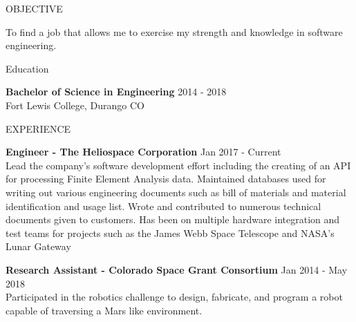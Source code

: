 \documentclass{resume} %
\begin{document}

\begin{rSection}{OBJECTIVE}

{To find a job that allows me to exercise my strength and knowledge in software engineering.}

\end{rSection}

\begin{rSection}{Education}

{\bf Bachelor of Science in Engineering} \hfill {2014 - 2018}
\\ 
Fort Lewis College, Durango CO

\end{rSection}


\begin{rSection}{EXPERIENCE}

{\textbf{Engineer - The Heliospace Corporation} \hfill Jan 2017 - Current \\
Lead the company's software development effort including the creating of an API for processing Finite Element Analysis data. Maintained databases used for writing out various engineering documents such as bill of materials and material identification and usage list. Wrote and contributed to numerous technical documents given to customers. Has been on multiple hardware integration and test teams for projects such as the James Webb Space Telescope and NASA's Lunar Gateway }

{\textbf{Research Assistant - Colorado Space Grant Consortium} \hfill Jan 2014 - May 2018 \\
Participated in the robotics challenge to design, fabricate, and program a robot capable of traversing a Mars like environment. }


\end{rSection} 
\end{document}
